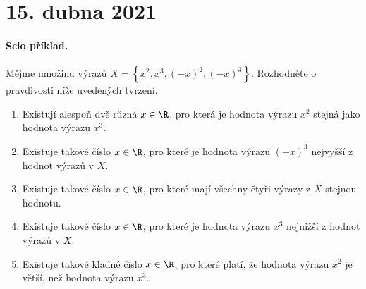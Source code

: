 \documentclass[11pt,a4paper]{article}
\begin{document}
    \section*{15. dubna 2021}
        
        \paragraph*{Scio příklad.} Mějme množinu výrazů $X = \left\{ x^2,x^3,(-x)^2,(-x)^3 \right\}$. Rozhodněte o pravdivosti níže uvedených tvrzení.
        \begin{enumerate}[label=(\alph*)]
            \item Existují alespoň dvě různá $x \in \R$, pro která je hodnota výrazu $x^2$ stejná jako hodnota výrazu $x^3$.

            \item Existuje takové číslo $x \in \R$, pro které je hodnota výrazu $(-x)^3$ nejvyšší z hodnot výrazů v $X$.
            
            \item Existuje takové číslo $x \in \R$, pro které mají všechny čtyři výrazy z $X$ stejnou hodnotu.
            
            \item Existuje takové číslo $x \in \R$, pro které je hodnota výrazu $x^3$ nejnižší z hodnot výrazů v $X$.
            
            \item Existuje takové kladné číslo $x \in \R$, pro které platí, že hodnota výrazu $x^2$ je větší, než hodnota výrazu $x^3$.
        \end{enumerate}
\end{document}
